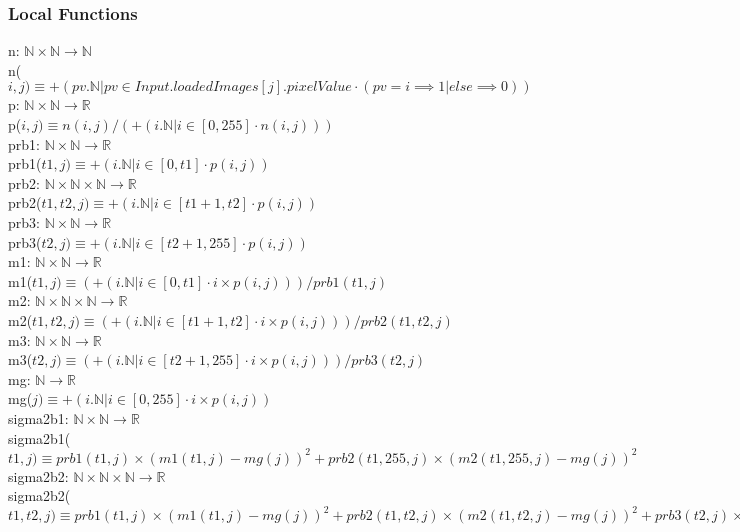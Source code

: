 \documentclass[12pt, titlepage]{article}
\begin{document}
\subsubsection{Local Functions}

n: $\mathbb{N} \times \mathbb{N} \rightarrow \mathbb{N}$\\
n($i,j) \equiv +(pv.\mathbb{N} |pv \in Input.loadedImages[j].pixelValue \cdot
(pv = i \implies 1 | else \implies 0))$\\
p: $\mathbb{N} \times \mathbb{N} \rightarrow \mathbb{R}$\\
p($i,j) \equiv n(i,j)/(+(i.\mathbb{N} | i \in [0,255] \cdot n(i,j)))$\\
prb1: $\mathbb{N} \times \mathbb{N} \rightarrow \mathbb{R}$\\
prb1($t1,j) \equiv +(i.\mathbb{N} | i \in [0,t1] \cdot p(i,j))$\\
prb2: $\mathbb{N} \times \mathbb{N} \times \mathbb{N} \rightarrow \mathbb{R}$\\
prb2($t1,t2,j) \equiv +(i.\mathbb{N} | i \in [t1+1,t2] \cdot p(i,j))$\\
prb3: $\mathbb{N} \times \mathbb{N} \rightarrow \mathbb{R}$\\
prb3($t2,j) \equiv +(i.\mathbb{N} | i \in [t2+1,255] \cdot p(i,j))$\\
m1: $\mathbb{N} \times \mathbb{N} \rightarrow \mathbb{R}$\\
m1($t1,j) \equiv (+(i.\mathbb{N} | i \in [0,t1] \cdot i \times
p(i,j)))/prb1(t1,j)$\\
m2: $\mathbb{N} \times \mathbb{N} \times \mathbb{N} \rightarrow \mathbb{R}$\\
m2($t1,t2,j) \equiv (+(i.\mathbb{N} | i \in [t1+1,t2] \cdot i \times
p(i,j)))/prb2(t1,t2,j)$\\
m3: $\mathbb{N} \times \mathbb{N} \rightarrow \mathbb{R}$\\
m3($t2,j) \equiv (+(i.\mathbb{N} | i \in [t2+1,255] \cdot i \times
p(i,j)))/prb3(t2,j)$\\
mg: $\mathbb{N} \rightarrow \mathbb{R}$\\
mg($j) \equiv +(i.\mathbb{N} | i \in [0,255] \cdot i \times p(i,j))$\\
sigma2b1: $\mathbb{N} \times \mathbb{N} \rightarrow \mathbb{R}$\\
sigma2b1($t1,j) \equiv prb1(t1,j) \times (m1(t1,j)-mg(j))^2 + prb2(t1,255,j)
\times (m2(t1,255,j)-mg(j))^2$\\
sigma2b2: $\mathbb{N} \times \mathbb{N} \times \mathbb{N} \rightarrow
\mathbb{R}$\\
sigma2b2($t1,t2,j) \equiv prb1(t1,j) \times (m1(t1,j)-mg(j))^2 + prb2(t1,t2,j)
\times (m2(t1,t2,j)-mg(j))^2 + prb3(t2,j) \times (m3(t2,j)-mg(j))^2$\\
\end{document}

